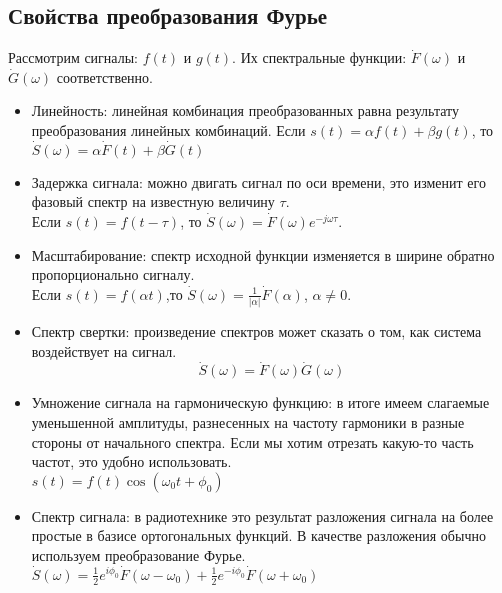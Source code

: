 \documentclass[a4paper]{article}
\begin{document}
\subsection{Свойства преобразования Фурье}
Рассмотрим сигналы: $f(t)$ и $g(t)$. Их спектральные функции: $\dot{F}(\omega)$ и $\dot{G}(\omega)$ соответственно.\\
\begin{itemize}
\item Линейность: линейная комбинация преобразованных равна результату преобразования линейных
комбинаций.
Если $s(t)=\alpha f(t)+\beta g(t)$, то $\dot{S}(\omega)=\alpha\dot{F}(t)+\beta\dot{G}(t)$\\
\item Задержка сигнала: можно двигать сигнал по оси времени, это изменит его фазовый спектр на известную величину $\tau$.\\
Если $s(t)=f(t-\tau)$, то $\dot{S}(\omega)=\dot{F}(\omega)e^{-j\omega\tau}$.\\
\item Масштабирование: спектр исходной функции изменяется в ширине обратно пропорционально сигналу.\\
Если $s(t)=f(\alpha t)$,то $\dot{S}(\omega)=\frac{1}{|\alpha|}\dot{F}(\alpha)$, $\alpha\neq0$.\\
\item Спектр свертки: произведение спектров может сказать о том, как система воздействует на сигнал.\\
$$\dot{S}(\omega)=\dot{F}(\omega)\dot{G}(\omega)$$
\item Умножение сигнала на гармоническую функцию: в итоге имеем слагаемые уменьшенной амплитуды, разнесенных на частоту гармоники в разные стороны от начального спектра. Если мы хотим отрезать какую-то часть частот, это удобно использовать.\\
$s(t)=f(t)\cos{(\omega_0t+\phi_0)}$\\
\item Спектр сигнала: в радиотехнике это результат разложения сигнала на более простые в базисе ортогональных функций. В качестве разложения обычно используем преобразование Фурье.\\
$\dot{S}(\omega)=\frac{1}{2}e^{i\phi_0}\dot{F}(\omega-\omega_0)+\frac{1}{2}e^{-i\phi_0}\dot{F}(\omega+\omega_0)$\\
\end{itemize}
\end{document}
